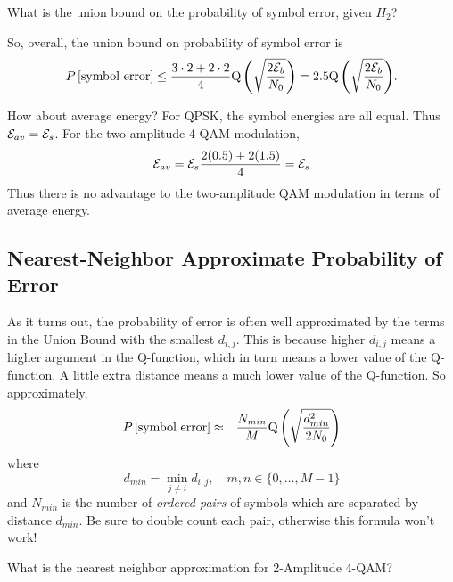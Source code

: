 What is the union bound on the probability of symbol error, given
$H_2$? 

So, overall, the union bound on probability of symbol error is
\[
  P\left[{\mbox{symbol error} }\right] \le  \frac{3\cdot 2 + 2\cdot 2}{4} {\mbox{Q}\left( {\sqrt{\frac{2 \mathcal{E}_b}{ N_0}}} \right)} = 2.5 {\mbox{Q}\left( {\sqrt{\frac{2 \mathcal{E}_b}{ N_0}}} \right)}.
\]

How about average energy? For QPSK, the symbol energies are all
equal.  Thus $\mathcal{E}_{av} = \mathcal{E}_s$.  For the two-amplitude 4-QAM
modulation,
\[
  \mathcal{E}_{av} = \mathcal{E}_s \frac{2(0.5) + 2(1.5)}{4} = \mathcal{E}_s
\]
Thus there is no advantage to the two-amplitude QAM modulation in
terms of average energy.





\subsection{Nearest-Neighbor Approximate Probability of Error}

As it turns out, the probability of error is often well approximated
by the terms in the Union Bound with the smallest
$d_{i,j}$.  This is because higher $d_{i,j}$ means a higher argument
in the Q-function, which in turn means a lower value of the
Q-function.  A little extra distance means a much lower value of the
Q-function.  So approximately,
\begin{eqnarray} \label{E:NearestNeighborApproximatePError}
  P\left[{\mbox{symbol error}}\right]  &\approx & \frac{N_{min}}{M}  {\mbox{Q}\left( {\sqrt{\frac{d^2_{min}}{2N_0}}} \right)} \nonumber
\end{eqnarray}
where
\[
  d_{min} = \min_{j\neq i} d_{i,j}, \quad m,n \in \{0, \ldots, M-1\}
\]
and $N_{min}$ is the number of \emph{ordered pairs} of symbols which are separated by distance $d_{min}$.  Be sure to double count each pair, otherwise this formula won't work!

What is the nearest neighbor approximation for 2-Amplitude 4-QAM?

